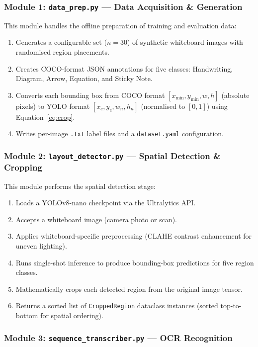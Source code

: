 \documentclass[11pt, a4paper]{article}
\begin{document}
\subsubsection{Module 1: \texttt{data\_prep.py} — Data Acquisition \& Generation}

This module handles the offline preparation of training and evaluation data:
\begin{enumerate}
  \item Generates a configurable set ($n = 30$) of synthetic whiteboard images with randomised region placements.
  \item Creates COCO-format JSON annotations for five classes: Handwriting, Diagram, Arrow, Equation, and Sticky Note.
  \item Converts each bounding box from COCO format $[x_{\min}, y_{\min}, w, h]$ (absolute pixels) to YOLO format $[x_c, y_c, w_n, h_n]$ (normalised to $[0,1]$) using Equation~\eqref{eq:crop}.
  \item Writes per-image \texttt{.txt} label files and a \texttt{dataset.yaml} configuration.
\end{enumerate}

\subsubsection{Module 2: \texttt{layout\_detector.py} — Spatial Detection \& Cropping}

This module performs the spatial detection stage:
\begin{enumerate}
  \item Loads a YOLOv8-nano checkpoint via the Ultralytics API.
  \item Accepts a whiteboard image (camera photo or scan).
  \item Applies whiteboard-specific preprocessing (CLAHE contrast enhancement for uneven lighting).
  \item Runs single-shot inference to produce bounding-box predictions for five region classes.
  \item Mathematically crops each detected region from the original image tensor.
  \item Returns a sorted list of \texttt{CroppedRegion} dataclass instances (sorted top-to-bottom for spatial ordering).
\end{enumerate}

\subsubsection{Module 3: \texttt{sequence\_transcriber.py} — OCR Recognition}
\end{document}
